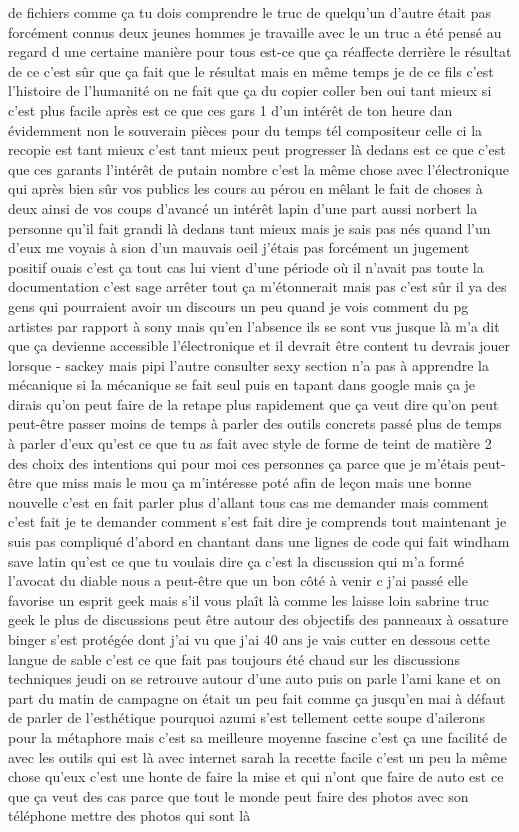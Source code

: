 de fichiers comme ça tu dois comprendre le truc de quelqu'un d'autre était pas forcément connus deux jeunes hommes je travaille avec le un truc a été pensé au regard d une certaine manière pour tous est-ce que ça réaffecte derrière le résultat de ce c'est sûr que ça fait que le résultat mais en même temps je de ce fils c'est l'histoire de l'humanité on ne fait que ça du copier coller ben oui tant mieux si c'est plus facile après est ce que ces gars 1 d'un intérêt de ton heure dan évidemment non le souverain pièces pour du temps tél compositeur celle ci la recopie est tant mieux c'est tant mieux peut progresser là dedans est ce que c'est que ces garants l'intérêt de putain nombre c'est la même chose avec l'électronique qui après bien sûr vos publics les cours au pérou en mêlant le fait de choses à deux ainsi de vos coups d'avancé un intérêt lapin d'une part aussi norbert la personne qu'il fait grandi là dedans tant mieux mais je sais pas nés quand l'un d'eux me voyais à sion d'un mauvais oeil j'étais pas forcément un jugement positif ouais c'est ça tout cas lui vient d'une période où il n'avait pas toute la documentation c'est sage arrêter tout ça m'étonnerait mais pas c'est sûr il ya des gens qui pourraient avoir un discours un peu quand je vois comment du pg artistes par rapport à sony mais qu'en l'absence ils se sont vus jusque là m'a dit que ça devienne accessible l'électronique et il devrait être content tu devrais jouer lorsque - sackey mais pipi l'autre consulter sexy section n'a pas à apprendre la mécanique si la mécanique se fait seul puis en tapant dans google mais ça je dirais qu'on peut faire de la retape plus rapidement que ça veut dire qu'on peut peut-être passer moins de temps à parler des outils concrets passé plus de temps à parler d'eux qu'est ce que tu as fait avec style de forme de teint de matière 2 des choix des intentions qui pour moi ces personnes ça parce que je m'étais peut-être que miss mais le mou ça m'intéresse poté afin de leçon mais une bonne nouvelle c'est en fait parler plus d'allant tous cas me demander mais comment c'est fait je te demander comment s'est fait dire je comprends tout maintenant je suis pas compliqué d'abord en chantant dans une lignes de code qui fait windham save latin qu'est ce que tu voulais dire ça c'est la discussion qui m'a formé l'avocat du diable nous a peut-être que un bon côté à venir c j'ai passé elle favorise un esprit geek mais s'il vous plaît là comme les laisse loin sabrine truc geek le plus de discussions peut être autour des objectifs des panneaux à ossature binger s'est protégée dont j'ai vu que j'ai 40 ans je vais cutter en dessous cette langue de sable c'est ce que fait pas toujours été chaud sur les discussions techniques jeudi on se retrouve autour d'une auto puis on parle l'ami kane et on part du matin de campagne on était un peu fait comme ça jusqu'en mai à défaut de parler de l'esthétique pourquoi azumi s'est tellement cette soupe d'ailerons pour la métaphore mais c'est sa meilleure moyenne fascine c'est ça une facilité de avec les outils qui est là avec internet sarah la recette facile c'est un peu la même chose qu'eux c'est une honte de faire la mise et qui n'ont que faire de auto est ce que ça veut des cas parce que tout le monde peut faire des photos avec son téléphone mettre des photos qui sont là 